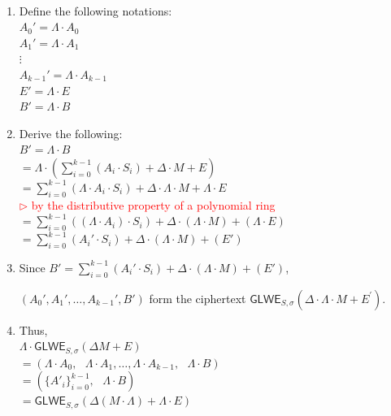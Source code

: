 $ $

\begin{myproof}
\begin{enumerate}
\item Define the following notations: \\
$A_0' = \Lambda \cdot A_0$ \\
$A_1' = \Lambda \cdot A_1$ \\
$\vdots$ \\
$A_{k-1}' = \Lambda \cdot A_{k-1}$ \\
$E' = \Lambda \cdot E$ \\
$B' = \Lambda \cdot B$ \\
\item Derive the following: \\
$B' = \Lambda \cdot B$ \\
$= \Lambda \cdot (\sum\limits_{i=0}^{k-1}{(A_i \cdot S_i)} + \Delta \cdot M + E)$ 
$= \sum\limits_{i=0}^{k-1}{(\Lambda \cdot A_i \cdot S_i)} + \Delta \cdot \Lambda \cdot M + \Lambda \cdot E$   \\ \textcolor{red}{ $\rhd$ by the distributive property of a polynomial ring} \\
$= \sum\limits_{i=0}^{k-1}{((\Lambda \cdot A_i) \cdot S_i)} + \Delta \cdot (\Lambda \cdot M) + (\Lambda \cdot E)$  \\
$= \sum\limits_{i=0}^{k-1}{(A_i' \cdot S_i)} + \Delta \cdot (\Lambda \cdot M) + (E')$ \\
\item Since $B' = \sum\limits_{i=0}^{k-1}{(A_i' \cdot S_i)} + \Delta \cdot (\Lambda \cdot M) + (E')$, 

$(A_0', A_1', \ldots, A_{k-1}'
, B')$ form the ciphertext $\textsf{GLWE}_{S, \sigma}(\Delta \cdot \Lambda \cdot M+E^{\prime})$.
\item Thus, \\
$\Lambda \cdot \textsf{GLWE}_{S, \sigma}(\Delta M + E)$ \\
$ = (\Lambda \cdot A_0, \text { } \Lambda \cdot A_1, \ldots, \Lambda \cdot A_{k-1}, \text { } \Lambda \cdot B)$ \\
$ = ( \{A'_{i}\}_{i=0}^{k-1}, \text { } \Lambda \cdot B)$ \\
$= \textsf{GLWE}_{S, \sigma}(\Delta (M \cdot \Lambda) + \Lambda \cdot E)$

\end{enumerate}
\end{myproof}

